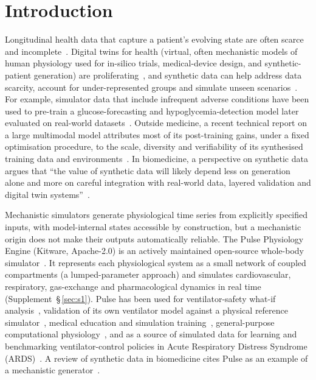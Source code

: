\documentclass[pdflatex,sn-nature]{sn-jnl}%
\begin{document}
\section{Introduction}\label{sec:intro}

Longitudinal health data that capture a patient's evolving state are often scarce and incomplete~\cite{katsoulakis2024digitaltwins}. Digital twins for health (virtual, often mechanistic models of human physiology used for in-silico trials, medical-device design, and synthetic-patient generation) are proliferating~\cite{katsoulakis2024digitaltwins}, and synthetic data can help address data scarcity, account for under-represented groups and simulate unseen scenarios~\cite{vanbreugel2024synthetic}. For example, simulator data that include infrequent adverse conditions have been used to pre-train a glucose-forecasting and hypoglycemia-detection model later evaluated on real-world datasets~\cite{hwang2025sim2real}. Outside medicine, a recent technical report on a large multimodal model attributes most of its post-training gains, under a fixed optimisation procedure, to the scale, diversity and verifiability of its synthesised training data and environments~\cite{deepseek2026v41flash}. In biomedicine, a perspective on synthetic data argues that ``the value of synthetic data will likely depend less on generation alone and more on careful integration with real-world data, layered validation and digital twin systems''~\cite{victoriano2026sim2real}.

Mechanistic simulators generate physiological time series from explicitly specified inputs, with model-internal states accessible by construction, but a mechanistic origin does not make their outputs automatically reliable. The Pulse Physiology Engine (Kitware, Apache-2.0) is an actively maintained open-source whole-body simulator~\cite{bray2019}. It represents each physiological system as a small network of coupled compartments (a lumped-parameter approach) and simulates cardiovascular, respiratory, gas-exchange and pharmacological dynamics in real time (Supplement~\S\,\ref{sec:s1}). Pulse has been used for ventilator-safety what-if analysis~\cite{webb2020}, validation of its own ventilator model against a physical reference simulator~\cite{webb2022vent}, medical education and simulation training~\cite{pulseinaction}, general-purpose computational physiology~\cite{bray2019}, and as a source of simulated data for learning and benchmarking ventilator-control policies in Acute Respiratory Distress Syndrome (ARDS)~\cite{ward2024ventilator}. A review of synthetic data in biomedicine cites Pulse as an example of a mechanistic generator~\cite{vanbreugel2024synthetic}.
\end{document}
